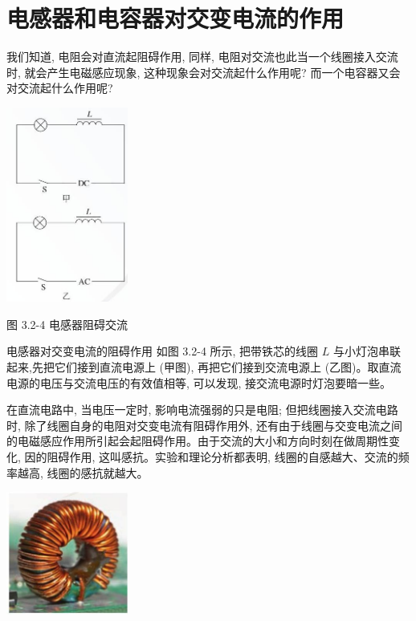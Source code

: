 \documentclass[10pt]{article}
\begin{document}
\section*{电感器和电容器对交变电流的作用}

我们知道, 电阻会对直流起阻碍作用, 同样, 电阻对交流也此当一个线圈接入交流时, 就会产生电磁感应现象, 这种现象会对交流起什么作用呢? 而一个电容器又会对交流起什么作用呢?

\begin{center}
\includegraphics[max width=0.3\textwidth]{images/01910e72-c5b7-7ed5-a6d4-fb3a5faefc32_61_801549.jpg}
\end{center}

图 3.2-4 电感器阻碍交流

电感器对交变电流的阻碍作用 如图 3.2-4 所示, 把带铁芯的线圈 \(L\) 与小灯泡串联起来,先把它们接到直流电源上 (甲图), 再把它们接到交流电源上 (乙图)。取直流电源的电压与交流电压的有效值相等, 可以发现, 接交流电源时灯泡要暗一些。

在直流电路中, 当电压一定时, 影响电流强弱的只是电阻; 但把线圈接入交流电路时, 除了线圈自身的电阻对交变电流有阻碍作用外, 还有由于线圈与交变电流之间的电磁感应作用所引起会起阻碍作用。由于交流的大小和方向时刻在做周期性变化, 因的阻碍作用, 这叫感抗。实验和理论分析都表明, 线圈的自感越大、交流的频率越高, 线圈的感抗就越大。

\begin{center}
\includegraphics[max width=0.3\textwidth]{images/01910e72-c5b7-7ed5-a6d4-fb3a5faefc32_61_252347.jpg}
\end{center}
\end{document}
